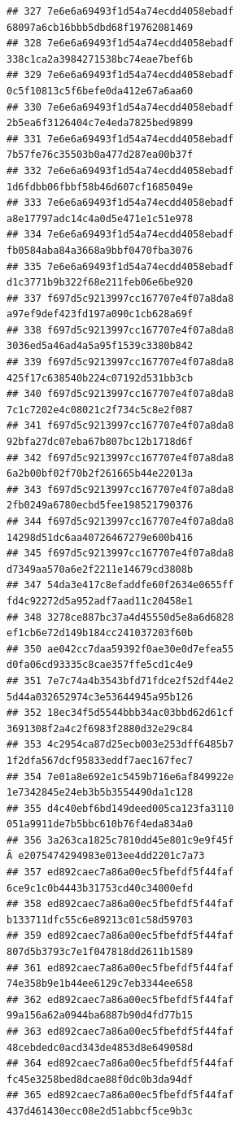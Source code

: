 \documentclass[]{article}
\begin{document}
\begin{verbatim}
## 327 7e6e6a69493f1d54a74ecdd4058ebadf   68097a6cb16bbb5dbd68f19762081469
## 328 7e6e6a69493f1d54a74ecdd4058ebadf   338c1ca2a3984271538bc74eae7bef6b
## 329 7e6e6a69493f1d54a74ecdd4058ebadf   0c5f10813c5f6befe0da412e67a6aa60
## 330 7e6e6a69493f1d54a74ecdd4058ebadf   2b5ea6f3126404c7e4eda7825bed9899
## 331 7e6e6a69493f1d54a74ecdd4058ebadf   7b57fe76c35503b0a477d287ea00b37f
## 332 7e6e6a69493f1d54a74ecdd4058ebadf   1d6fdbb06fbbf58b46d607cf1685049e
## 333 7e6e6a69493f1d54a74ecdd4058ebadf   a8e17797adc14c4a0d5e471e1c51e978
## 334 7e6e6a69493f1d54a74ecdd4058ebadf   fb0584aba84a3668a9bbf0470fba3076
## 335 7e6e6a69493f1d54a74ecdd4058ebadf   d1c3771b9b322f68e211feb06e6be920
## 337 f697d5c9213997cc167707e4f07a8da8   a97ef9def423fd197a090c1cb628a69f
## 338 f697d5c9213997cc167707e4f07a8da8   3036ed5a46ad4a5a95f1539c3380b842
## 339 f697d5c9213997cc167707e4f07a8da8   425f17c638540b224c07192d531bb3cb
## 340 f697d5c9213997cc167707e4f07a8da8   7c1c7202e4c08021c2f734c5c8e2f087
## 341 f697d5c9213997cc167707e4f07a8da8   92bfa27dc07eba67b807bc12b1718d6f
## 342 f697d5c9213997cc167707e4f07a8da8   6a2b00bf02f70b2f261665b44e22013a
## 343 f697d5c9213997cc167707e4f07a8da8   2fb0249a6780ecbd5fee198521790376
## 344 f697d5c9213997cc167707e4f07a8da8   14298d51dc6aa40726467279e600b416
## 345 f697d5c9213997cc167707e4f07a8da8   d7349aa570a6e2f2211e14679cd3808b
## 347 54da3e417c8efaddfe60f2634e0655ff   fd4c92272d5a952adf7aad11c20458e1
## 348 3278ce887bc37a4d45550d5e8a6d6828   ef1cb6e72d149b184cc241037203f60b
## 350 ae042cc7daa59392f0ae30e0d7efea55   d0fa06cd93335c8cae357ffe5cd1c4e9
## 351 7e7c74a4b3543bfd71fdce2f52df44e2   5d44a032652974c3e53644945a95b126
## 352 18ec34f5d5544bbb34ac03bbd62d61cf   3691308f2a4c2f6983f2880d32e29c84
## 353 4c2954ca87d25ecb003e253dff6485b7   1f2dfa567dcf95833eddf7aec167fec7
## 354 7e01a8e692e1c5459b716e6af849922e   1e7342845e24eb3b5b3554490da1c128
## 355 d4c40ebf6bd149deed005ca123fa3110   051a9911de7b5bbc610b76f4eda834a0
## 356 3a263ca1825c7810dd45e801c9e9f45f Â e2075474294983e013ee4dd2201c7a73
## 357 ed892caec7a86a00ec5fbefdf5f44faf   6ce9c1c0b4443b31753cd40c34000efd
## 358 ed892caec7a86a00ec5fbefdf5f44faf   b133711dfc55c6e89213c01c58d59703
## 359 ed892caec7a86a00ec5fbefdf5f44faf   807d5b3793c7e1f047818dd2611b1589
## 361 ed892caec7a86a00ec5fbefdf5f44faf   74e358b9e1b44ee6129c7eb3344ee658
## 362 ed892caec7a86a00ec5fbefdf5f44faf   99a156a62a0944ba6887b90d4fd77b15
## 363 ed892caec7a86a00ec5fbefdf5f44faf   48cebdedc0acd343de4853d8e649058d
## 364 ed892caec7a86a00ec5fbefdf5f44faf   fc45e3258bed8dcae88f0dc0b3da94df
## 365 ed892caec7a86a00ec5fbefdf5f44faf   437d461430ecc08e2d51abbcf5ce9b3c

\end{verbatim}
\end{document}
